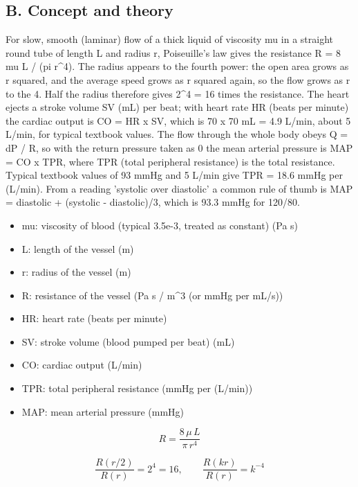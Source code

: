 \documentclass[11pt,a4paper]{article}
\begin{document}
\subsection*{B. Concept and theory}
For slow, smooth (laminar) flow of a thick liquid of viscosity mu in a straight round tube of length L and radius r, Poiseuille's law gives the resistance R = 8 mu L / (pi r\textasciicircum{}4). The radius appears to the fourth power: the open area grows as r squared, and the average speed grows as r squared again, so the flow grows as r to the 4. Half the radius therefore gives 2\textasciicircum{}4 = 16 times the resistance. The heart ejects a stroke volume SV (mL) per beat; with heart rate HR (beats per minute) the cardiac output is CO = HR x SV, which is 70 x 70 mL = 4.9 L/min, about 5 L/min, for typical textbook values. The flow through the whole body obeys Q = dP / R, so with the return pressure taken as 0 the mean arterial pressure is MAP = CO x TPR, where TPR (total peripheral resistance) is the total resistance. Typical textbook values of 93 mmHg and 5 L/min give TPR = 18.6 mmHg per (L/min). From a reading 'systolic over diastolic' a common rule of thumb is MAP = diastolic + (systolic - diastolic)/3, which is 93.3 mmHg for 120/80.

\begin{itemize}[nosep]
\item mu: viscosity of blood (typical 3.5e-3, treated as constant) (Pa s)
\item L: length of the vessel (m)
\item r: radius of the vessel (m)
\item R: resistance of the vessel (Pa s / m\textasciicircum{}3 (or mmHg per mL/s))
\item HR: heart rate (beats per minute)
\item SV: stroke volume (blood pumped per beat) (mL)
\item CO: cardiac output (L/min)
\item TPR: total peripheral resistance (mmHg per (L/min))
\item MAP: mean arterial pressure (mmHg)
\end{itemize}

\begin{equation*}
R=\frac{8\,\mu\,L}{\pi\,r^{4}}
\end{equation*}

\begin{equation*}
\frac{R(r/2)}{R(r)}=2^{4}=16,\qquad \frac{R(kr)}{R(r)}=k^{-4}
\end{equation*}
\end{document}
